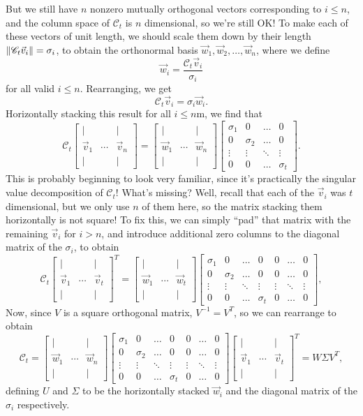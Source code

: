 \documentclass[letterpaper]{article}
\theoremstyle{remark}
\newcommand{\mat}[1]{\ensuremath{\begin{bmatrix}#1\end{bmatrix}}}
\begin{document}
But we still have $n$ nonzero mutually orthogonal vectors corresponding to $i \le n$, and the column space of $\mathscr{C}_t$ is $n$ dimensional, so we're still OK! To make each of these vectors of unit length, we should scale them down by their length $\norm{\mathscr{C}_t\vec{v}_i} = \sigma_i$, to obtain the orthonormal basis $\vec{w}_1, \vec{w}_2, \ldots, \vec{w}_n$, where we define
\[
    \vec{w}_i = \frac{\mathscr{C}_t\vec{v}_i}{\sigma_i}
\]
for all valid $i \le n$. Rearranging, we get
\[
    \mathscr{C}_t\vec{v}_i = \sigma_i\vec{w}_i.
\]
Horizontally stacking this result for all $i \le n$m, we find that
\[
    \mathscr{C}_t \mat{| & & | \\ \vec{v}_1 & \cdots & \vec{v}_n \\ | & & |} = \mat{| & & | \\ \vec{w}_1 & \cdots & \vec{w}_n \\ | & & |} \mat{\sigma_1 & 0 & \ldots &  0 \\ 0 & \sigma_2 & \ldots & 0 \\ \vdots & \vdots & \ddots & \vdots \\ 0 & 0 & \ldots & \sigma_t}.
\]
This is probably beginning to look very familiar, since it's practically the singular value decomposition of $\mathscr{C}_t$! What's missing? Well, recall that each of the $\vec{v}_i$ was $t$ dimensional, but we only use $n$ of them here, so the matrix stacking them horizontally is not square! To fix this, we can simply ``pad'' that matrix with the remaining $\vec{v}_i$ for $i > n$, and introduce additional zero columns to the diagonal matrix of the $\sigma_i$, to obtain
\[
    \mathscr{C}_t \mat{| & & | \\ \vec{v}_1 & \cdots & \vec{v}_t \\ | & & |}^T = \mat{| & & | \\ \vec{w}_1 & \cdots & \vec{w}_t \\ | & & |} \mat{\sigma_1 & 0 & \ldots & 0 & 0 & \ldots & 0 \\ 0 & \sigma_2 & \ldots & 0 & 0 & \ldots & 0 \\ \vdots & \vdots & \ddots & \vdots & \vdots & \ddots & \vdots \\ 0 & 0 & \ldots & \sigma_t & 0 & \ldots & 0},
\]
Now, since $V$ is a square orthogonal matrix, $V^{-1} = V^T$, so we can rearrange to obtain
\[
    \mathscr{C}_t = \mat{| & & | \\ \vec{w}_1 & \cdots & \vec{w}_n \\ | & & |} \mat{\sigma_1 & 0 & \ldots & 0 & 0 & \ldots & 0 \\ 0 & \sigma_2 & \ldots & 0 & 0 & \ldots & 0 \\ \vdots & \vdots & \ddots & \vdots & \vdots & \ddots & \vdots \\ 0 & 0 & \ldots & \sigma_t & 0 & \ldots & 0}\mat{| & & | \\ \vec{v}_1 & \cdots & \vec{v}_t \\ | & & |}^T = W\Sigma V^T,
\]
defining $U$ and $\Sigma$ to be the horizontally stacked $\vec{w}_i$ and the diagonal matrix of the $\sigma_i$ respectively.
\end{document}
